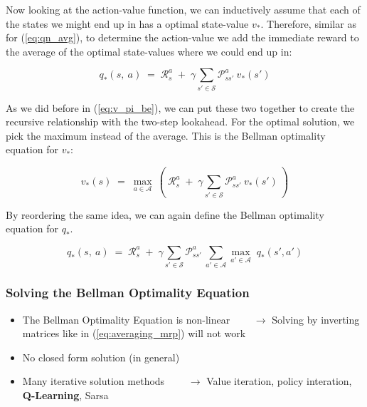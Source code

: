 \documentclass[10pt]{article}
\begin{document}
Now looking at the action-value function, we can inductively assume that each of the states we might end up in has a optimal state-value $v_{*}$. Therefore, similar as for (\ref{eq:qn_avg}), to determine the action-value we add the immediate reward to the average of the optimal state-values where we could end up in:

\begin{equation}
q_{*}(s,\:a)\;=\;\mathcal{R}_{s}^{a}\;+\;\gamma \sum_{s' \in \mathcal{S}} \mathcal{P}_{ss'}^{a}\:v_{*}(s')
\end{equation}

As we did before in (\ref{eq:v_pi_be}), we can put these two together to create the recursive relationship with the two-step lookahead. For the optimal solution, we pick the maximum instead of the average. This is the Bellman optimality equation for $v_{*}$:

\begin{equation}
v_{*}(s)\;=\;\mathop{max}_{a \in \mathcal{A}}\: \left( \: \mathcal{R}_{s}^{a}\;+\;\gamma \sum_{s' \in \mathcal{S}} \mathcal{P}_{ss'}^{a}\:v_{*}(s') \: \right)
\end{equation}

By reordering the same idea, we can again define the Bellman optimality equation for $q_{*}$. 

\begin{equation}
q_{*}(s,\:a)\;=\;\mathcal{R}_{s}^{a}\;+\;\gamma \sum_{s' \in \mathcal{S}} \mathcal{P}_{ss'}^{a}\: \sum_{a' \in \mathcal{A}} \mathop{max}_{a' \in \mathcal{A}} \; q_{*}(s', a')
\end{equation}

\subsubsection*{Solving the Bellman Optimality Equation}

\begin{itemize}
\item The Bellman Optimality Equation is non-linear \newline
$\qquad \rightarrow$ Solving by inverting matrices like in (\ref{eq:averaging_mrp}) will not work
\item No closed form solution (in general)
\item Many iterative solution methods \newline
$\qquad \rightarrow$ Value iteration, policy interation, \textbf{Q-Learning}, Sarsa
\end{itemize}
\newpage
\end{document}
